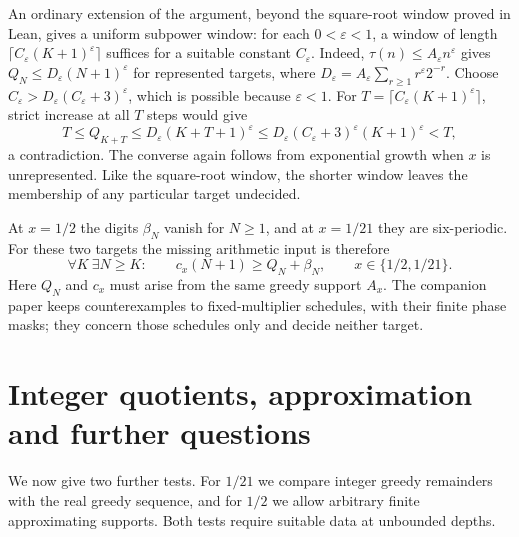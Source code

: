 \documentclass[11pt]{article}
\begin{document}
An ordinary extension of the argument, beyond the square-root window
proved in Lean, gives a uniform subpower window: for each
$0<\varepsilon<1$, a window of length
$\lceil C_\varepsilon(K+1)^\varepsilon\rceil$ suffices for a suitable
constant $C_\varepsilon$. Indeed, $\tau(n)\le A_\varepsilon n^\varepsilon$ gives
$Q_N\le D_\varepsilon(N+1)^\varepsilon$ for represented targets,
where $D_\varepsilon=A_\varepsilon\sum_{r\ge1}r^\varepsilon2^{-r}$.
Choose $C_\varepsilon>D_\varepsilon(C_\varepsilon+3)^\varepsilon$,
which is possible because $\varepsilon<1$.
For $T=\lceil C_\varepsilon(K+1)^\varepsilon\rceil$, strict increase
at all $T$ steps would give
\[
 T\le Q_{K+T}\le D_\varepsilon(K+T+1)^\varepsilon
 \le D_\varepsilon(C_\varepsilon+3)^\varepsilon(K+1)^\varepsilon<T,
\]
a contradiction. The converse again follows from exponential growth
when $x$ is unrepresented. Like the square-root window, the shorter
window leaves the membership of any particular target undecided.

At $x=1/2$ the digits $\beta_N$ vanish for $N\ge1$, and at $x=1/21$
they are six-periodic. For these two targets the missing arithmetic
input is therefore
\begin{equation}
 \forall K\ \exists N\ge K:\qquad
 c_x(N+1)\ge Q_N+\beta_N,
 \qquad x\in\{1/2,1/21\}.
 \label{eq:actual-selector-obligation}
\end{equation}
Here $Q_N$ and $c_x$ must arise from the same greedy support $A_x$.
The companion paper keeps counterexamples to fixed-multiplier
schedules, with their finite phase masks; they concern those schedules
only and decide neither target.

\section{Integer quotients, approximation and further questions}\label{sec:open}
We now give two further tests. For $1/21$ we compare integer greedy
remainders with the real greedy sequence, and for $1/2$ we allow
arbitrary finite approximating supports. Both tests require suitable
data at unbounded depths.
\end{document}
